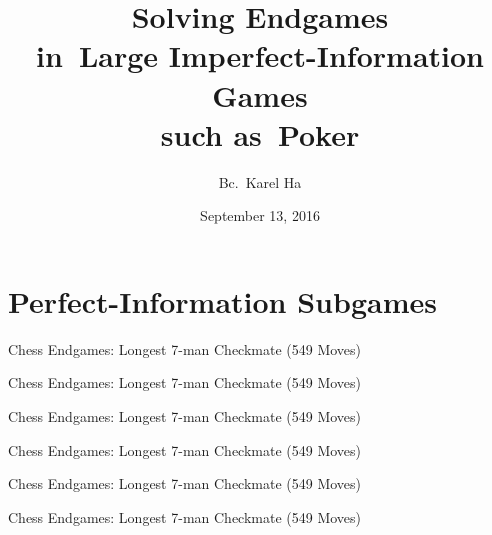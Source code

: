\documentclass{beamer}
\title{Solving Endgames \\in~Large Imperfect-Information Games \\such as~Poker}
\date{September 13, 2016}
\author{Bc.~Karel Ha}
\institute{Department of~Applied Mathematics \\Charles University}
\theoremstyle{definition}
\begin{document}
  \maketitle


  \section{Perfect-Information Subgames}
  \def\chessTitle{Chess Endgames: Longest 7-man Checkmate (549 Moves)}
  \begin{frame}{\chessTitle}
    \begin{figure}[H]
      \centering
      \newgame
      \showboard
    \end{figure}
  \end{frame}

  \begin{frame}{\chessTitle}
    \begin{figure}[H]
      \centering
      \showboard
    \end{figure}
  \end{frame}

  \begin{frame}{\chessTitle}
    \begin{figure}[H]
      \centering
      \showboard
    \end{figure}
  \end{frame}

  \begin{frame}{\chessTitle}
    \begin{figure}[H]
      \centering
      \showboard
    \end{figure}
  \end{frame}

  \begin{frame}{\chessTitle}
    \begin{figure}[H]
      \centering
      \showboard
    \end{figure}
  \end{frame}

  \begin{frame}{\chessTitle}
    \begin{figure}[H]
      \centering
      \showboard
    \end{figure}
  \end{frame}
\end{document}
